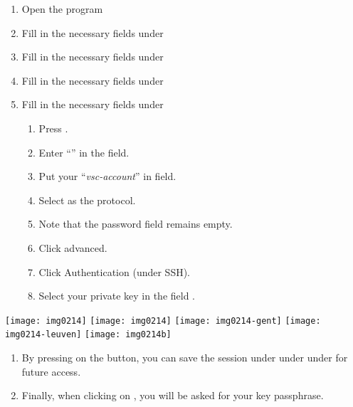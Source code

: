   \begin{enumerate}
  \item  Open the program
\ifantwerpen
  \item  Fill in the necessary fields under 
\fi
\ifgent
  \item  Fill in the necessary fields under 
\fi
\ifbrussel
  \item  Fill in the necessary fields under 
\fi
\ifleuven
  \item  Fill in the necessary fields under 
\fi
  \begin{enumerate}
  \item  Press .
  \item  Enter ``\emph{\loginnode}'' in the  field.
  \item  Put your ``\emph{vsc-account}'' in  field.
  \item  Select  as the  protocol.
  \item  Note that the password field remains empty.
  \item  Click advanced.
  \item  Click Authentication (under SSH).
  \item  Select your private key in the field .
  \end{enumerate}
  \end{enumerate}

  \begin{center}
\ifantwerpen
  \texttt{[image: img0214]}
\fi
\ifbrussel
  \texttt{[image: img0214]}
\fi
\ifgent
  \texttt{[image: img0214-gent]}
\fi
\ifleuven
  \texttt{[image: img0214-leuven]}
\fi
  \texttt{[image: img0214b]}
  \end{center}

  \begin{enumerate}
  \item  By pressing on the  button, you can save the session
\ifantwerpen
       under 
\fi
\ifgent
       under 
\fi
\ifbrussel
       under 
\fi
for future access.
  \item  Finally, when clicking on , you will be asked for your key passphrase.
  \end{enumerate}

